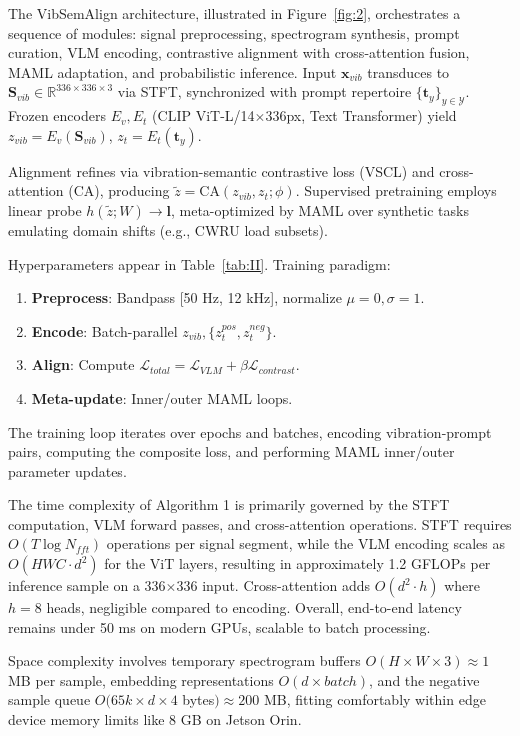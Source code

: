 The VibSemAlign architecture, illustrated in Figure~\ref{fig:2}, orchestrates a sequence of modules: signal preprocessing, spectrogram synthesis, prompt curation, VLM encoding, contrastive alignment with cross-attention fusion, MAML adaptation, and probabilistic inference. Input $\mathbf{x}_{vib}$ transduces to $\mathbf{S}_{vib} \in \mathbb{R}^{336 \times 336 \times 3}$ via STFT, synchronized with prompt repertoire $\{\mathbf{t}_y\}_{y\in\mathcal{Y}}$. Frozen encoders $E_v, E_t$ (CLIP ViT-L/14$\times$336px, Text Transformer) yield $z_{vib} = E_v(\mathbf{S}_{vib})$, $z_t = E_t(\mathbf{t}_y)$.

Alignment refines via vibration-semantic contrastive loss (VSCL) and cross-attention (CA), producing $\tilde{z} = \mathrm{CA}(z_{vib}, z_t; \phi)$. Supervised pretraining employs linear probe $h(\tilde{z}; W) \to \mathbf{l}$, meta-optimized by MAML over synthetic tasks emulating domain shifts (e.g., CWRU load subsets).

Hyperparameters appear in Table~\ref{tab:II}. Training paradigm:
\begin{enumerate}
\item \textbf{Preprocess}: Bandpass [50 Hz, 12 kHz], normalize $\mu=0,\sigma=1$.
\item \textbf{Encode}: Batch-parallel $z_{vib}, \{z_t^{pos}, z_t^{neg}\}$.
\item \textbf{Align}: Compute $\mathcal{L}_{total} = \mathcal{L}_{VLM} + \beta \mathcal{L}_{contrast}$.
\item \textbf{Meta-update}: Inner/outer MAML loops.
\end{enumerate}
The training loop iterates over epochs and batches, encoding vibration-prompt pairs, computing the composite loss, and performing MAML inner/outer parameter updates.

The time complexity of Algorithm 1 is primarily governed by the STFT computation, VLM forward passes, and cross-attention operations. STFT requires $O(T \log N_{fft})$ operations per signal segment, while the VLM encoding scales as $O(HWC \cdot d^2)$ for the ViT layers, resulting in approximately 1.2 GFLOPs per inference sample on a 336$\times$336 input. Cross-attention adds $O(d^2 \cdot h)$ where $h=8$ heads, negligible compared to encoding. Overall, end-to-end latency remains under 50 ms on modern GPUs, scalable to batch processing.

Space complexity involves temporary spectrogram buffers $O(H \times W \times 3) \approx 1$ MB per sample, embedding representations $O(d \times batch)$, and the negative sample queue $O(65k \times d \times 4$ bytes$) \approx 200$ MB, fitting comfortably within edge device memory limits like 8 GB on Jetson Orin.

